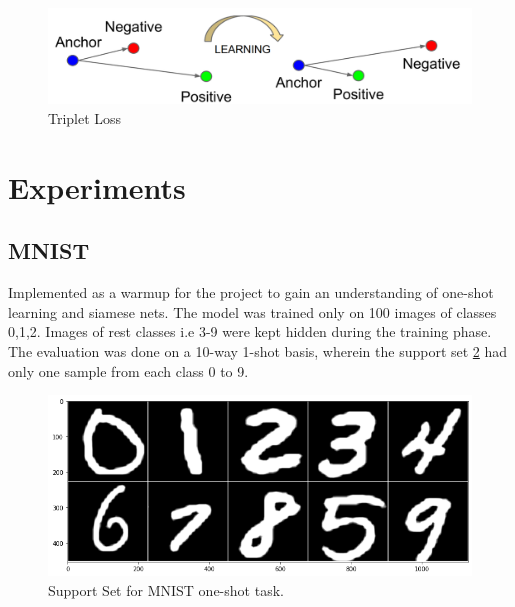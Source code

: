 \documentclass[
12pt,
tightenlines,
aps,
prb,
twocolumn,
superscriptaddress,
longbibliography,
floatfix
]{revtex4-2}
\begin{document}
\begin{figure}[h]
    \includegraphics[clip=true,width=\columnwidth]{Tripletloss.png}
    \caption{Triplet Loss} 
     \label{fig:tripletloss}
\end{figure}


\section{\label{sec:Experiments}Experiments}
\subsection{MNIST}
Implemented as a warmup for the project to gain an understanding of one-shot learning and siamese nets.
The model was trained only on 100 images of classes 0,1,2. Images of rest classes i.e 3-9 were kept hidden during the training phase.
The evaluation was done on a 10-way 1-shot basis, wherein the support set \ref{fig:support} had only one sample from each class 0 to 9.

\begin{figure}[h]
    \includegraphics[clip=true,width=\columnwidth]{support.png}
    \caption{Support Set for MNIST one-shot task.} 
     \label{fig:support}
\end{figure}
\end{document}
